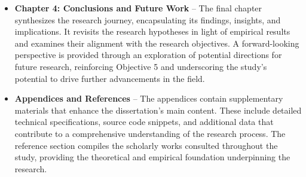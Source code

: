 \documentclass{article}
\begin{document}
\begin{itemize}
    \item \textbf{Chapter 4: Conclusions and Future Work} – The final chapter synthesizes the research journey, encapsulating its findings, insights, and implications. It revisits the research hypotheses in light of empirical results and examines their alignment with the research objectives. A forward-looking perspective is provided through an exploration of potential directions for future research, reinforcing Objective 5 and underscoring the study’s potential to drive further advancements in the field.

    \item \textbf{Appendices and References} – The appendices contain supplementary materials that enhance the dissertation’s main content. These include detailed technical specifications, source code snippets, and additional data that contribute to a comprehensive understanding of the research process. The reference section compiles the scholarly works consulted throughout the study, providing the theoretical and empirical foundation underpinning the research.

\end{itemize}




\end{document}
